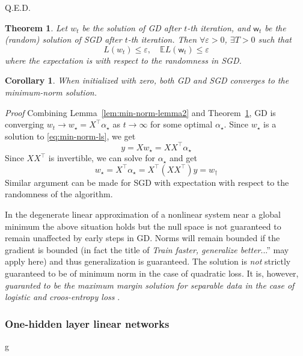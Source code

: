 \documentclass[10pt]{article}
\newtheorem{theorem}{Theorem}
\newtheorem{corollary}{Corollary}
\begin{document}
Q.E.D.

\begin{theorem}
  Let $w_t$ be the solution of GD after $t$-th
  iteration, and $\mathsf{w}_t$ be the (random) solution of SGD after $t$-th iteration. Then $\forall
  \varepsilon>0$, $\exists T>0$ such that
  \[
  L(w_t) \leq \varepsilon,\quad \mathbb{E}L(\mathsf{w}_t) \leq \varepsilon
  \]
  where the expectation is with respect to the randomness in SGD.
  \label{thm:min-norm-gd-converge}
\end{theorem}

\begin{corollary}
When initialized with zero, both GD and SGD converges to the minimum-norm solution.
\end{corollary}
{\it Proof}
  Combining Lemma~\ref{lem:min-norm-lemma2} and Theorem~\ref{thm:min-norm-gd-converge}, GD is
  converging $w_t \rightarrow w_\star=X^\top\alpha_\star$ as $t\rightarrow \infty$ for some optimal
  $\alpha_\star$. Since $w_\star$ is a solution to \eqref{eq:min-norm-ls}, we get
  \[
  y = Xw_\star = XX^\top \alpha_\star
  \]
  Since $XX^\top$ is invertible, we can solve for $\alpha_\star$ and get
  \[
  w_\star = X^\top \alpha_\star = X^\top (XX^\top) y = w_\dagger
  \]
  Similar argument can be made for SGD with expectation with respect to the randomness of the
  algorithm.


  In the degenerate linear approximation of a nonlinear system near a
  global minimum the above situation holds but the null space is not
  guaranteed to remain unaffected by early steps in GD. Norms will
  remain bounded if the gradient is bounded (in fact the title of
  \cite{DBLP:journals/corr/HardtRS15} {\it Train faster, generalize
    better}...'' may apply here) and thus generalization is
  guaranteed.  The solution is {\it not} strictly guaranteed to be of
  minimum norm in the case of quadratic loss. It is, however,
  {\it guaranted to be the maximum margin solution for separable data
    in the case of logistic and croos-entropy loss}
  \cite{2017arXiv171010345S}.



\subsubsection{One-hidden layer linear networks}
\label{DeepNetsLinSusubsection}g
\end{document}
